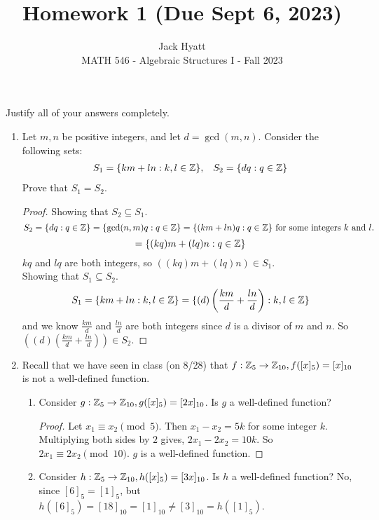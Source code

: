 \documentclass[12pt]{article}
\begin{document}
	
	
	
	\title{Homework 1 (Due Sept 6, 2023)}
	\author{Jack Hyatt\\ %
		MATH 546 - Algebraic Structures I - Fall 2023} 
	
	\maketitle
	
	Justify all of your answers completely.\\
	
	
	\medskip 
	
	\begin{enumerate}
		\item Let $m, n$ be positive integers, and let $d = \gcd(m, n)$.
		Consider the following sets:
		\begin{align*}
			S_1 = \{km+ln : k,l\in\mathbb{Z}\}, && S_2=\{dq : q\in\mathbb{Z}\}
		\end{align*}
		Prove that $S_1=S_2$.
		\begin{proof}
			Showing that $S_2\subseteq S_1$.\\
			\[S_2 = \{dq:q\in\mathbb{Z}\} = \{\gcd(n,m)q:q\in\mathbb{Z}\} = \{(km+ln)q:q\in\mathbb{Z}\} \text{ for some integers $k$ and $l$.}\]
			\[= \{(kq)m+(lq)n:q\in\mathbb{Z}\}\]
			$kq$ and $lq$ are both integers, so $\left((kq)m + (lq)n\right) \in S_1$.\\
			Showing that $S_1 \subseteq S_2$.\\
			\[S_1 = \{km+ln : k,l\in\mathbb{Z}\} = \{(d)\left(\frac{km}{d}+\frac{ln}{d}\right) : k,l\in\mathbb{Z}\}\]
			and we know $\frac{km}{d}$ and $\frac{ln}{d}$ are both integers since $d$ is a divisor of $m$ and $n$. So $\left((d)\left(\frac{km}{d}+\frac{ln}{d}\right)\right) \in S_2$. 
		\end{proof}
		\item Recall that we have seen in class (on 8/28) that $f : \mathbb{Z}_5 \rightarrow \mathbb{Z}_{10}, f([x]_5) = [x]_{10}$ is not a well-defined function.
		\begin{enumerate}
			\item Consider $g : \mathbb{Z}_5 \rightarrow \mathbb{Z}_{10}, g([x]_5) = [2x]_{10}$. Is $g$ a well-defined function?
			\begin{proof}
				Let $x_1 \equiv x_2 \pmod{5}$. Then $x_1-x_2 = 5k$ for some integer $k$. Multiplying both sides by $2$ gives, $2x_1 -2x_2 = 10k$. So $2x_1 \equiv 2x_2 \pmod{10}$. \Therefore $g$ is a well-defined function.
			\end{proof}
			\item Consider $h : \mathbb{Z}_5 \rightarrow \mathbb{Z}_{10}, h([x]_5) = [3x]_{10}$. Is $h$ a well-defined function?\m
			No, since $[6]_5 = [1]_5$, but
			$h([6]_5) = [18]_{10} = [1]_{10} \neq [3]_{10} = h([1]_5)$.
		\end{enumerate}
		

\end{enumerate}
\end{document}

